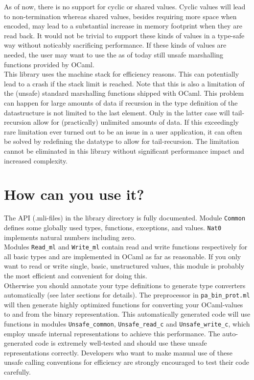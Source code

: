 \documentclass[12pt]{article}
\begin{document}
As of now, there is no support for cyclic or shared values.  Cyclic values
will lead to non-termination whereas shared values, besides requiring more
space when encoded, may lead to a substantial increase in memory footprint
when they are read back.  It would not be trivial to support these kinds
of values in a type-safe way without noticably sacrificing performance.
If these kinds of values are needed, the user may want to use the as of
today still unsafe marshalling functions provided by OCaml.\\

This library uses the machine stack for efficiency reasons.  This can
potentially lead to a crash if the stack limit is reached.  Note that this
is also a limitation of the (unsafe) standard marshalling functions shipped
with OCaml.  This problem can happen for large amounts of data if recursion in
the type definition of the datastructure is not limited to the last element.
Only in the latter case will tail-recursion allow for (practically) unlimited
amounts of data.  If this exceedingly rare limitation ever turned out to
be an issue in a user application, it can often be solved by redefining the
datatype to allow for tail-recursion.  The limitation cannot be eliminated in
this library without significant performance impact and increased complexity.

\section{How can you use it?}

The API (.mli-files) in the library directory is fully documented.  Module
\verb=Common= defines some globally used types, functions, exceptions,
and values.  \verb=Nat0= implements natural numbers including zero.\\

Modules \verb=Read_ml= and \verb=Write_ml= contain read and write functions
respectively for all basic types and are implemented in OCaml as far as
reasonable.  If you only want to read or write single, basic, unstructured
values, this module is probably the most efficient and convenient for
doing this.\\

Otherwise you should annotate your type definitions to generate type
converters automatically (see later sections for details).  The preprocessor
in \verb=pa_bin_prot.ml= will then generate highly optimized functions
for converting your OCaml-values to and from the binary representation.
This automatically generated code will use functions in modules
\verb=Unsafe_common=, \verb=Unsafe_read_c= and \verb=Unsafe_write_c=,
which employ unsafe internal representations to achieve this performance.
The auto-generated code is extremely well-tested and should use these unsafe
representations correctly.  Developers who want to make manual use of these
unsafe calling conventions for efficiency are strongly encouraged to test
their code carefully.\\
\end{document}
